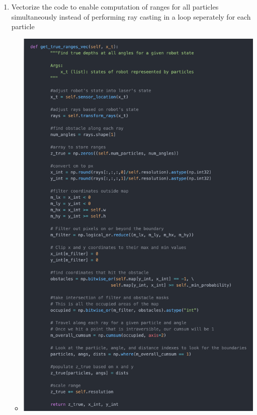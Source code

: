 \documentclass[12pt, a4paper]{article}
\begin{document}
\begin{enumerate}
  \item Vectorize the code to enable computation of ranges for all particles simultaneously instead of performing ray casting in a loop seperately for each particle
  \begin{itemize}
    \item 
    \begin{minipage}[t]{\linewidth}
      \vspace{0pt}
      \begin{center}
        \includegraphics[scale=0.25]{./results/ray_casting_opt_2.png}
        \label{fig:sm_1}
      \end{center}
    \end{minipage}
  \end{itemize}
\end{enumerate}
\end{document}
